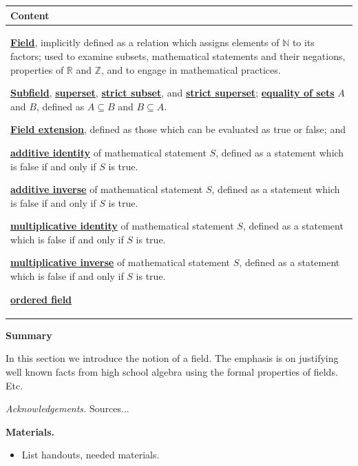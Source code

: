 \documentclass[11pt]{article}
\newcommand\header[1]{\vspace*{4pt}\par {\large {\bf #1}}\par}
\newenvironment{bignote}[1][Instructor note]%
	{\begin{mdframed}\raggedright{\bf #1.~}}
	{\end{mdframed}}
\newcommand{\R}{\mathbb{R}}
\newcommand{\N}{\mathbb{N}}
\newcommand{\Z}{\mathbb{Z}}
\renewcommand\subset\subseteq
\renewcommand\emph[1]{\underline{\bf{#1}}} %
\theoremstyle{definition}
\begin{document}
 \vspace*{-16pt}
\begin{tabular}{L{6.5in}} 
{\bf Content} \\ \hline \parskip4pt
\emph{Field}, implicitly defined as a relation which assigns elements of $\N$ to its factors; used to examine subsets, mathematical statements and their negations, properties of $\R$ and $\Z$, and to engage in mathematical practices. 

\emph{Subfield}, \emph{superset}, \emph{strict subset}, and \emph{strict superset}; \emph{equality of sets} $A$ and $B$, defined as $A\subset B$ and $B\subset A$.

\emph{Field extension}, defined as those which can be evaluated as true or false; and 

\emph{additive identity} of mathematical statement $S$, defined as a statement which is false if and only if $S$ is true.

\emph{additive inverse} of mathematical statement $S$, defined as a statement which is false if and only if $S$ is true.

\emph{multiplicative identity} of mathematical statement $S$, defined as a statement which is false if and only if $S$ is true.

\emph{multiplicative inverse} of mathematical statement $S$, defined as a statement which is false if and only if $S$ is true.

\emph{ordered field}

\end{tabular}

\header{Summary}

In this section we introduce the notion of a field. The emphasis is on justifying well known facts from high school algebra using the formal properties of
fields. Etc.
 

{\it Acknowledgements.} Sources...

\newpage
\begin{bignote}[Materials]
\begin{itemize}
  \item List handouts, needed materials.
\end{itemize}
\end{bignote}


\end{document}
